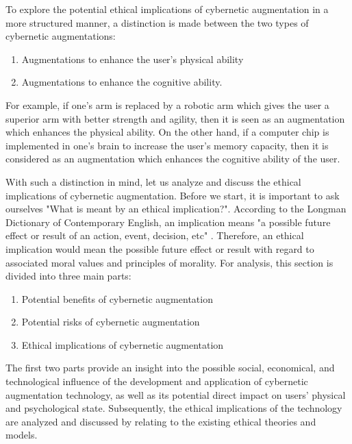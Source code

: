 To explore the potential ethical implications of cybernetic augmentation in a more structured manner, a distinction is made between the two types of cybernetic augmentations: 
\begin{enumerate}
	\item Augmentations to enhance the user's physical ability
	\item Augmentations to enhance the cognitive ability.
\end{enumerate}
For example, if one's arm is replaced by a robotic arm which gives the user a superior arm with better strength and agility, then it is seen as an augmentation which enhances the physical ability. On the other hand, if a computer chip is implemented in one's brain to increase the user's memory capacity, then it is considered as an augmentation which enhances the cognitive ability of the user. 

With such a distinction in mind, let us analyze and discuss the ethical implications of cybernetic augmentation. Before we start, it is important to ask ourselves "What is meant by an ethical implication?". According to the Longman Dictionary of Contemporary English, an implication means "a possible future effect or result of an action, event, decision, etc" \cite{Longman_dic}. Therefore, an ethical implication would mean the possible future effect or result with regard to associated moral values and principles of morality. For analysis, this section is divided into three main parts: 
\begin{enumerate}
	\item Potential benefits of cybernetic augmentation
	\item Potential risks of cybernetic augmentation
	\item Ethical implications of cybernetic augmentation
\end{enumerate}
The first two parts provide an insight into the possible social, economical, and technological influence of the development and application of cybernetic augmentation technology, as well as its potential direct impact on users' physical and psychological state. Subsequently, the ethical implications of the technology are analyzed and discussed by relating to the existing ethical theories and models.

